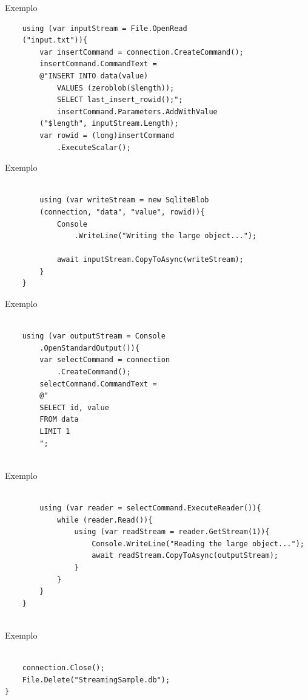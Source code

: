 \documentclass{beamer}
\begin{document}
\begin{frame}[fragile]{Exemplo}
\begin{lstlisting}
	using (var inputStream = File.OpenRead
	("input.txt")){
		var insertCommand = connection.CreateCommand();
		insertCommand.CommandText =
		@"INSERT INTO data(value) 
			VALUES (zeroblob($length));
			SELECT last_insert_rowid();";
			insertCommand.Parameters.AddWithValue
		("$length", inputStream.Length);
		var rowid = (long)insertCommand
			.ExecuteScalar();

\end{lstlisting}
\end{frame}

\begin{frame}[fragile]{Exemplo}
\begin{lstlisting}

		using (var writeStream = new SqliteBlob
		(connection, "data", "value", rowid)){
			Console
				.WriteLine("Writing the large object...");
			
			await inputStream.CopyToAsync(writeStream);
		}
	}

\end{lstlisting}
\end{frame}

\begin{frame}[fragile]{Exemplo}
\begin{lstlisting}

	using (var outputStream = Console
		.OpenStandardOutput()){
		var selectCommand = connection
			.CreateCommand();
		selectCommand.CommandText =
		@"
		SELECT id, value
		FROM data
		LIMIT 1
		";
		
\end{lstlisting}
\end{frame}

\begin{frame}[fragile]{Exemplo}
\begin{lstlisting}
		
		using (var reader = selectCommand.ExecuteReader()){
			while (reader.Read()){
				using (var readStream = reader.GetStream(1)){
					Console.WriteLine("Reading the large object...");
					await readStream.CopyToAsync(outputStream);
				}
			}
		}
	}
	
\end{lstlisting}
\end{frame}

\begin{frame}[fragile]{Exemplo}
\begin{lstlisting}

	connection.Close();
	File.Delete("StreamingSample.db");
}
	
\end{lstlisting}
\end{frame}
\end{document}
